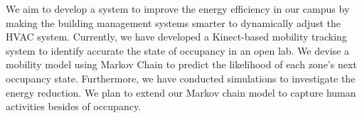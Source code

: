 \documentclass{sig-alternate}
\begin{document}
We aim to develop a system to improve the energy efficiency in our
campus by making the building management systems smarter to
dynamically adjust the HVAC system. Currently, we have developed a
Kinect-based mobility tracking system to identify accurate the state
of occupancy in an open lab. We devise a mobility model using Markov
Chain to predict the likelihood of each zone's next occupancy
state. Furthermore, we have conducted simulations to investigate the
energy reduction. We plan to extend our Markov chain model to capture
human activities besides of occupancy.  









\end{document}

